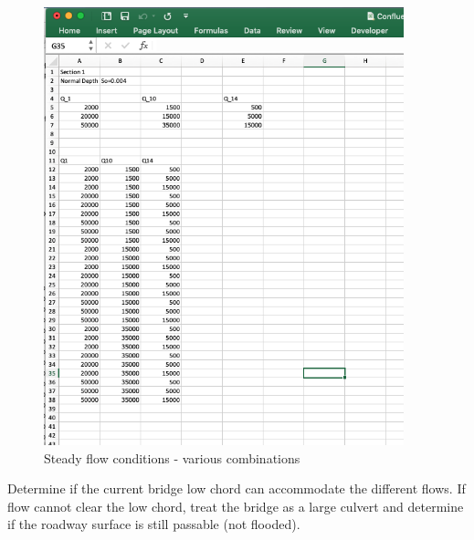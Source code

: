 \begin{figure}[h!] %
   \centering
   \includegraphics[height=5in]{steady-flow-conditions.png} 
   \caption{Steady flow conditions - various combinations}
   \label{fig:steady-flow-conditions}
\end{figure}
Determine if the current bridge low chord can accommodate the different flows. 
If flow cannot clear the low chord, treat the bridge as a large culvert and determine if the roadway surface is still passable (not flooded).

